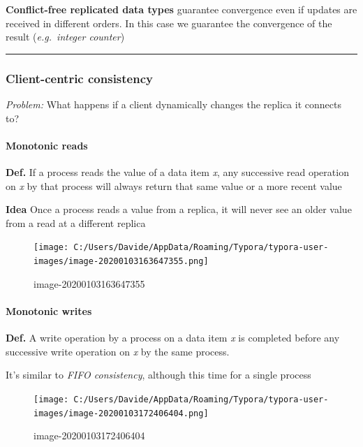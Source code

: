 \textbf{Conflict-free replicated data types} guarantee convergence even
if updates are received in different orders. In this case we guarantee
the convergence of the result (\emph{e.g.~integer counter})

\begin{center}\rule{3in}{0.4pt}\end{center}

\subsubsection{Client-centric
consistency}\label{client-centric-consistency}

\emph{Problem:} What happens if a client dynamically changes the replica
it connects to?

\paragraph{Monotonic reads}\label{monotonic-reads}

\textbf{Def.} If a process reads the value of a data item \emph{x}, any
successive read operation on \emph{x} by that process will always return
that same value or a more recent value

\textbf{Idea} Once a process reads a value from a replica, it will never
see an older value from a read at a different replica

\begin{figure}[htbp]
\centering
\texttt{[image: C:/Users/Davide/AppData/Roaming/Typora/typora-user-images/image-20200103163647355.png]}
\caption{image-20200103163647355}
\end{figure}

\paragraph{Monotonic writes}\label{monotonic-writes}

\textbf{Def.} A write operation by a process on a data item \emph{x} is
completed before any successive write operation on \emph{x} by the same
process.

It's similar to \emph{FIFO consistency}, although this time for a single
process

\begin{figure}[htbp]
\centering
\texttt{[image: C:/Users/Davide/AppData/Roaming/Typora/typora-user-images/image-20200103172406404.png]}
\caption{image-20200103172406404}
\end{figure}

